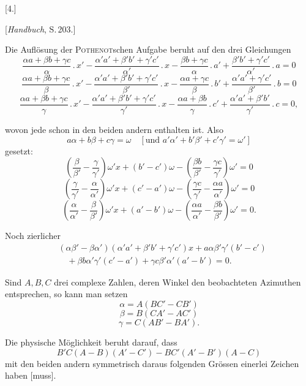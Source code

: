 
\begin{center}
[4.]

[\emph{Handbuch}, S.\,203.]
\end{center}

Die Auflösung der \textsc{Pothenot}schen Aufgabe beruht auf den drei Gleichungen
\[
\frac{\alpha a+\beta b+\gamma c}{\alpha}\, . \, x' - \frac{\alpha' a'+\beta' b'+\gamma' c'}{\alpha'}\, . \, x - \frac{\beta b+\gamma c}{\alpha}\, . \, a' + \frac{\beta' b'+\gamma' c'}{\alpha'}\, . \, a = 0
\]
\[
\frac{\alpha a+\beta b+\gamma c}{\beta}\, . \, x' - \frac{\alpha' a'+\beta' b'+\gamma' c'}{\beta'}\, . \, x - \frac{\alpha a+\gamma c}{\beta}\, . \, b' + \frac{\alpha' a'+\gamma' c'}{\beta'}\, . \, b = 0
\]
\[
\frac{\alpha a+\beta b+\gamma c}{\gamma}\, . \, x' - \frac{\alpha' a'+\beta' b'+\gamma' c'}{\gamma'}\, . \, x - \frac{\alpha a+\beta b}{\gamma}\, . \, c' + \frac{\alpha' a'+\beta' b'}{\gamma'}\, . \, c = 0,
\]

wovon jede schon in den beiden andern enthalten ist. Also
\[
a\alpha+b\beta+c\gamma=\omega \quad [\text{und } a'\alpha'+b'\beta'+c'\gamma'=\omega']
\]
gesetzt:
\[
\left(\frac{\beta}{\beta'}-\frac{\gamma}{\gamma'}\right)\omega' x + (b'-c')\omega - \left(\frac{\beta b}{\beta'}-\frac{\gamma c}{\gamma'}\right)\omega' = 0
\]
\[
\left(\frac{\gamma}{\gamma'}-\frac{\alpha}{\alpha'}\right)\omega' x + (c'-a')\omega - \left(\frac{\gamma c}{\gamma'}-\frac{\alpha a}{\alpha'}\right)\omega' = 0
\]
\[
\left(\frac{\alpha}{\alpha'}-\frac{\beta}{\beta'}\right)\omega' x + (a'-b')\omega - \left(\frac{\alpha a}{\alpha'}-\frac{\beta b}{\beta'}\right)\omega' = 0.
\]

Noch zierlicher
\[
\begin{aligned}
&(\alpha\beta'-\beta\alpha')(\alpha' a'+\beta' b'+\gamma' c')x + a\alpha\beta'\gamma'(b'-c')\\
&\quad+ \beta b\alpha'\gamma'(c'-a') + \gamma c\beta'\alpha'(a'-b') = 0.
\end{aligned}
\]

\medskip

Sind $A, B, C$ drei complexe Zahlen, deren Winkel den beobachteten Azimuthen entsprechen, so kann man setzen
\[
\alpha = A(BC'-CB')
\]
\[
\beta = B(CA'-AC')
\]
\[
\gamma = C(AB'-BA').
\]

Die physische Möglichkeit beruht darauf, dass
\[
B'C(A-B)(A'-C') - BC'(A'-B')(A-C)
\]
mit den beiden andern symmetrisch daraus folgenden Grössen einerlei Zeichen haben [muss].

